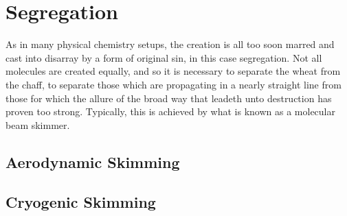 \chapter{Segregation}

As in many physical chemistry setups, the creation is all too soon marred and cast into disarray by a form of original sin, in this case segregation. Not all molecules are created equally, and so it is necessary to separate the wheat from the chaff, to separate those which are propagating in a nearly straight line from those for which the allure of the broad way that leadeth unto destruction has proven too strong. Typically, this is achieved by what is known as a molecular beam skimmer.

\section{Aerodynamic Skimming}

\section{Cryogenic Skimming}
